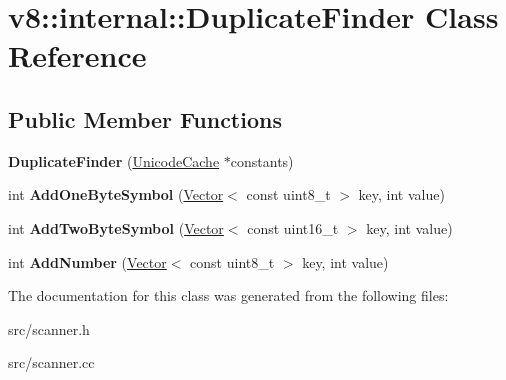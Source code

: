 \hypertarget{classv8_1_1internal_1_1_duplicate_finder}{}\section{v8\+:\+:internal\+:\+:Duplicate\+Finder Class Reference}
\label{classv8_1_1internal_1_1_duplicate_finder}
\subsection*{Public Member Functions}
\begin{DoxyCompactItemize}
\item 
\hypertarget{classv8_1_1internal_1_1_duplicate_finder_a927b48956e82ff809b782a602987d4e3}{}{\bfseries Duplicate\+Finder} (\hyperlink{classv8_1_1internal_1_1_unicode_cache}{Unicode\+Cache} $\ast$constants)\label{classv8_1_1internal_1_1_duplicate_finder_a927b48956e82ff809b782a602987d4e3}

\item 
\hypertarget{classv8_1_1internal_1_1_duplicate_finder_a347c1166134c068ac1239f54a452c4fe}{}int {\bfseries Add\+One\+Byte\+Symbol} (\hyperlink{classv8_1_1internal_1_1_vector}{Vector}$<$ const uint8\+\_\+t $>$ key, int value)\label{classv8_1_1internal_1_1_duplicate_finder_a347c1166134c068ac1239f54a452c4fe}

\item 
\hypertarget{classv8_1_1internal_1_1_duplicate_finder_a1b859971d4bdf0574b7e2b312eb1a764}{}int {\bfseries Add\+Two\+Byte\+Symbol} (\hyperlink{classv8_1_1internal_1_1_vector}{Vector}$<$ const uint16\+\_\+t $>$ key, int value)\label{classv8_1_1internal_1_1_duplicate_finder_a1b859971d4bdf0574b7e2b312eb1a764}

\item 
\hypertarget{classv8_1_1internal_1_1_duplicate_finder_a0a998fcfa8e1b5bf821110102c7fe2d4}{}int {\bfseries Add\+Number} (\hyperlink{classv8_1_1internal_1_1_vector}{Vector}$<$ const uint8\+\_\+t $>$ key, int value)\label{classv8_1_1internal_1_1_duplicate_finder_a0a998fcfa8e1b5bf821110102c7fe2d4}

\end{DoxyCompactItemize}


The documentation for this class was generated from the following files\+:\begin{DoxyCompactItemize}
\item 
src/scanner.\+h\item 
src/scanner.\+cc\end{DoxyCompactItemize}
